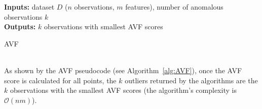 \begin{algorithm}
\SetAlgoLined
\textbf{Inputs:} dataset $D$ ($n$ observations, $m$ features), number of anomalous observations $k$ \\

\textbf{Outputs:} $k$ observations with smallest AVF scores
\caption{AVF}
\label{alg:AVF}
\end{algorithm}%
\ \\ \noindent As shown by the AVF pseudocode (see Algorithm~\ref{alg:AVF}), once the AVF score is calculated for all points, the $k$ outliers returned by the algorithms are the $k$ observations with the smallest AVF scores (the algorithm's complexity is $\mathcal{O}(nm)$). 


